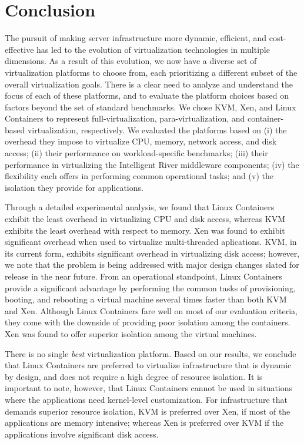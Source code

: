 \chapter{Conclusion}

The pursuit of making server infrastructure more dynamic, efficient, and cost-effective has led to the evolution of virtualization technologies in multiple dimensions. As a result of this evolution, we now have a diverse set of virtualization platforms to choose from, each prioritizing a different subset of the overall virtualization goals. There is a clear need to analyze and understand the focus of each of these platforms, and to evaluate the platform choices based on factors beyond the set of standard benchmarks. We chose KVM, Xen, and Linux Containers to represent full-virtualization, para-virtualization, and container-based virtualization, respectively. We evaluated the platforms based on (i) the overhead they impose to virtualize CPU, memory, network access, and disk access; (ii) their performance on workload-specific benchmarks; (iii) their performance in virtualizing the Intelligent River\textsuperscript{\textregistered} middleware components; (iv) the flexibility each offers in performing common operational tasks; and (v) the isolation they provide for applications.

Through a detailed experimental analysis, we found that Linux Containers exhibit the least overhead in virtualizing CPU and disk access, whereas KVM exhibits the least overhead with respect to memory. Xen was found to exhibit significant overhead when used to virtualize multi-threaded aplications. KVM, in its current form, exhibits significant overhead in virtualizing disk access; however, we note that the problem is being addressed with major design changes slated for release in the near future. From an operational standpoint, Linux Containers provide a significant advantage by performing the common tasks of provisioning, booting, and rebooting a virtual machine several times faster than both KVM and Xen. Although Linux Containers fare well on most of our evaluation criteria, they come with the downside of providing poor isolation among the containers. Xen was found to offer superior isolation among the virtual machines.

There is no single \emph{best} virtualization platform. Based on our results, we conclude that Linux Containers are preferred to virtualize infrastructure that is dynamic by design, and does not require a high degree of resource isolation. It is important to note, however, that Linux Containers cannot be used in situations where the applications need kernel-level customization. For infrastructure that demands superior resource isolation, KVM is preferred over Xen, if most of the applications are memory intensive; whereas Xen is preferred over KVM if the applications involve significant disk access.
